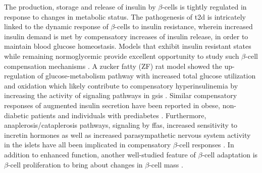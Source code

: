 The production, storage and release of insulin by $\beta$-cells is tightly regulated in response to changes in metabolic status. The pathogenesis of \gls{t2d} is intricately linked to the dynamic response of $\beta$-cells to insulin resistance, wherein increased insulin demand is met by compensatory increases of insulin release, in order to maintain blood glucose homeostasis. %
Models that exhibit insulin resistant states while remaining normoglycemic provide excellent opportunity to study such $\beta$-cell compensation mechanisms \textbf{\cite{prentki_islet_2006, liu_beta-cell_2002}}. A zucker fatty (ZF) rat model showed the up-regulation of glucose-metabolism pathway with increased total glucose utilization and oxidation which likely contribute to compensatory hyperinsulinemia by increasing the activity of signaling pathways in \gls{gsis} \textbf{\cite{liu_beta-cell_2002}}. Similar compensatory responses of augmented insulin secretion have been reported in obese, non-diabetic patients and individuals with prediabetes \textbf{\cite{hudish__2019,chandrashekar_25-hydroxy_2015,polonsky_twenty-four-hour_1988}}. Furthermore, anaplerosis/cataplerosis pathways, signaling by \glspl{ffa}, increased sensitivity to incretin hormones as well as increased parasympathetic nervous system activity in the islets have all been implicated in compensatory $\beta$-cell responses \textbf{\cite{prentki_islet_2006}}. In addition to enhanced function, another well-studied feature of $\beta$-cell adaptation is $\beta$-cell proliferation to bring about changes in $\beta$-cell mass \textbf{\cite{hudish__2019}}.\\

